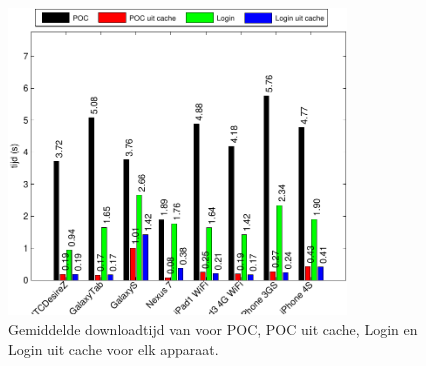 \begin{figure}
  \centering
  \includegraphics[width=0.8\textwidth]{figuren/performance-lungo.pdf}
  \caption{Gemiddelde downloadtijd van \lungo{} voor POC,  POC uit cache,  Login en Login uit cache voor elk apparaat.}
  \label{fig:performantie-lungo}
\end{figure}

